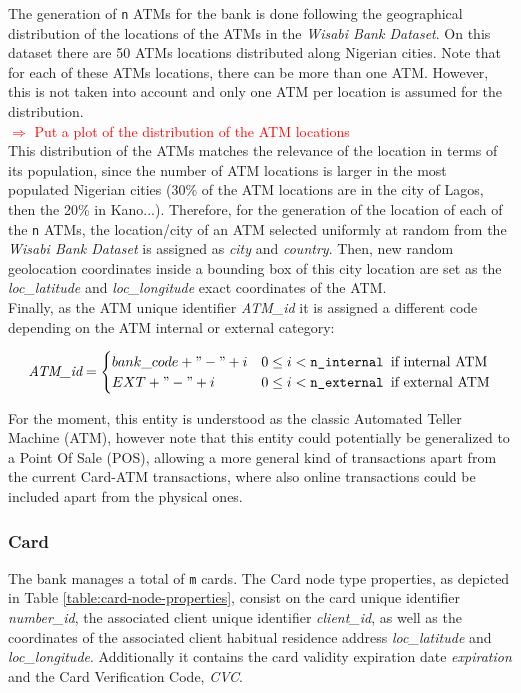 \documentclass{article}
\begin{document}
The generation of \texttt{n} ATMs for the bank is done following
the geographical distribution of the locations of the ATMs in the \emph{Wisabi Bank Dataset}. 
On this dataset there are 50 ATMs locations distributed along Nigerian cities. 
Note that for each of these ATMs locations, there can be more than one ATM.
However, this is not taken into account and only one ATM per location is assumed for the 
distribution.\\
\textcolor{red}{$\Rightarrow$ Put a plot of the distribution of the ATM locations}\\
This distribution of the ATMs matches the relevance of the location in terms of its 
population, since the number of ATM locations is larger in the most populated 
Nigerian cities (30\% of the ATM locations are in the city of Lagos, then the 20\% in 
Kano...).
Therefore, for the generation of the location of each of the \texttt{n} ATMs, the location/city of an ATM selected uniformly at random from the \emph{Wisabi Bank Dataset} is assigned as \emph{city} and \emph{country}. Then, new random geolocation coordinates 
inside a bounding box of this city location are set as the \emph{loc\_latitude} and \emph{loc\_longitude} exact coordinates of the ATM. \\
Finally, as the ATM unique identifier \emph{ATM\_id} it is assigned a different code depending on the ATM internal or external category: 

\[
\emph{ATM\_id} =
\begin{cases} 
bank\_code + "-" + i & 0 \leq i < \texttt{n\_internal } \text{if internal ATM}  \\
EXT + "-" + i & 0 \leq i < \texttt{n\_external } \text{if external ATM}
\end{cases}
\]

For the moment, this entity is understood as the classic Automated Teller Machine (ATM), however note that this entity could potentially be generalized to a Point Of Sale (POS), allowing a more general kind of transactions apart from the current Card-ATM transactions, where also online transactions could be included apart from the physical ones.

\subsubsection*{Card}



The bank manages a total of \texttt{m} cards. The Card node type properties, as depicted in Table
\ref{table:card-node-properties}, consist on the card unique 
identifier \emph{number\_id}, the associated client unique identifier \emph{client\_id}, as well
as the coordinates of the associated client habitual residence address \emph{loc\_latitude} and 
\emph{loc\_longitude}. Additionally it contains the card validity expiration date \emph{expiration}
and the Card Verification Code, \emph{CVC}.\\
\end{document}
